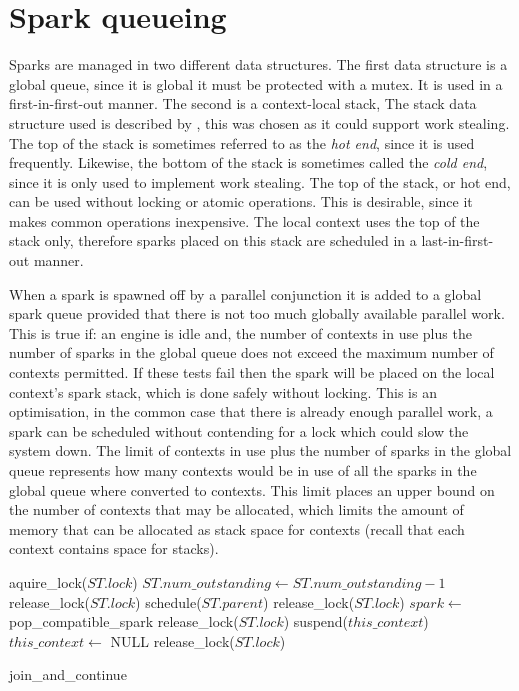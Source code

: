 \section{Spark queueing}

Sparks are managed in two different data structures.
The first data structure is a global queue,
since it is global it must be protected with a mutex.
It is used in a first-in-first-out manner.
The second is a context-local stack,
The stack data structure used is described by \citet{workstealing_queue},
this was chosen as it could support work stealing.
The top of the stack is sometimes referred to as the \emph{hot end},
since it is used frequently.
Likewise, the bottom of the stack is sometimes called the
\emph{cold end}, since it is only used to implement work stealing.
The top of the stack, or hot end, can be used without locking or atomic
operations.
This is desirable, since it makes common operations inexpensive.
The local context uses the top of the stack only,
therefore sparks placed on this stack are scheduled in a
last-in-first-out manner.

When a spark is spawned off by a parallel conjunction
it is added to a global spark queue provided that there is not too much
globally available parallel work.
This is true if:
an engine is idle and,
the number of contexts in use plus the number of sparks in the global queue
does not exceed the maximum number of contexts permitted.
If these tests fail then the spark will be placed on the local context's
spark stack,
which is done safely without locking.
This is an optimisation,
in the common case that there is already enough parallel work,
a spark can be scheduled without contending for a lock which could slow the
system down.
The limit of contexts in use plus the number of sparks in the global queue
represents how many contexts would be in use of all the sparks in the global
queue where converted to contexts.
This limit places an upper bound on the number of contexts that may be
allocated,
which limits the amount of memory that can be allocated as stack space for
contexts
(recall that each context contains space for stacks).

\begin{algorithm}
\begin{algorithmic}
  \State aquire\_lock($ST.lock$)
  \State $ST.num\_outstanding \gets ST.num\_outstanding - 1$
      \State release\_lock($ST.lock$)
    \Else
      \State schedule($ST.parent$)
      \State release\_lock($ST.lock$)
    \EndIf
  \Else
    \State $spark \gets$ pop\_compatible\_spark
       \State release\_lock($ST.lock$)
    \Else
         \State suspend($this\_context$)
         \State $this\_context \gets$ NULL
      \EndIf
      \State release\_lock($ST.lock$)
    \EndIf
  \EndIf
\EndProcedure
\end{algorithmic}
\caption{join\_and\_continue}
\label{alg:join_and_continue_peterw}
\end{algorithm}

